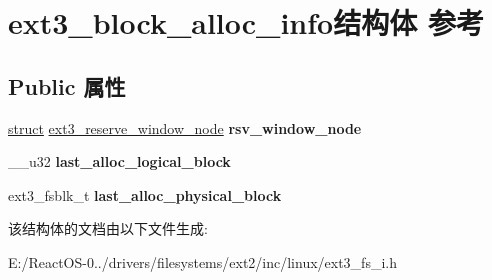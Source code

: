 \hypertarget{structext3__block__alloc__info}{}\section{ext3\+\_\+block\+\_\+alloc\+\_\+info结构体 参考}
\label{structext3__block__alloc__info}
\subsection*{Public 属性}
\begin{DoxyCompactItemize}
\item 
\mbox{\label{structext3__block__alloc__info_a2776790bbc963a5d7a375900be1f0c85}} 
\hyperlink{interfacestruct}{struct} \hyperlink{structext3__reserve__window__node}{ext3\+\_\+reserve\+\_\+window\+\_\+node} {\bfseries rsv\+\_\+window\+\_\+node}
\item 
\mbox{\label{structext3__block__alloc__info_a2a94b044cdca128457ce36b9e692b52b}} 
\+\_\+\+\_\+u32 {\bfseries last\+\_\+alloc\+\_\+logical\+\_\+block}
\item 
\mbox{\label{structext3__block__alloc__info_a5d26775ec97ea90dc5106b37685ed3e3}} 
ext3\+\_\+fsblk\+\_\+t {\bfseries last\+\_\+alloc\+\_\+physical\+\_\+block}
\end{DoxyCompactItemize}


该结构体的文档由以下文件生成\+:\begin{DoxyCompactItemize}
\item 
E\+:/\+React\+O\+S-\/0../drivers/filesystems/ext2/inc/linux/ext3\+\_\+fs\+\_\+i.\+h\end{DoxyCompactItemize}
